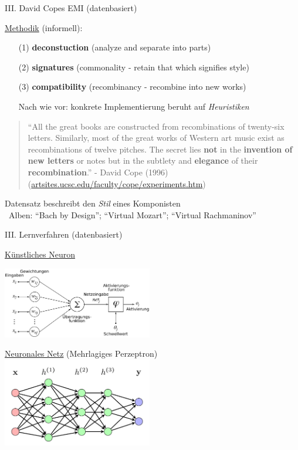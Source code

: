 \begin{frame}{III. \dimThreeTitle}{David Copes EMI (datenbasiert)}
	
	\underline{Methodik} (informell):
	\begin{itemize}	
		\item[(1)] \textbf{deconstuction} (analyze and separate into parts)
		\item[(2)] \textbf{signatures} (commonality - retain that which signifies style) 
		\item[(3)] \textbf{compatibility} (recombinancy - recombine into new works)
		\item[\warnSign] Nach wie vor: konkrete Implementierung beruht auf \emph{Heuristiken}
	\end{itemize}
	
	\medskip
	\begin{quote}
		\enquote{All the great books are constructed from recombinations of twenty-six letters. Similarly, most of the great works of Western art music exist as recombinations of twelve pitches. The secret lies \textbf{not} in the \textbf{invention of new letters} or notes but in the subtlety and \textbf{elegance} of their \textbf{recombination}.} - {\footnotesize David Cope (1996)}
		\\\hfill{\tiny(\url{artsites.ucsc.edu/faculty/cope/experiments.htm})}
	\end{quote}
	
	Datensatz beschreibt den \emph{Stil} eines Komponisten \citep{Cope96}\\
	\hfill\conclude~Alben: \enquote{Bach by Design}; \enquote{Virtual Mozart}; \enquote{Virtual Rachmaninov}
\end{frame}

\begin{frame}[t]{III. \dimThreeTitle}{Lernverfahren (datenbasiert)}
		\vspace{-1.5cm}
		\parbox{.49\textwidth}{
			\underline{Künstliches Neuron}
			\medskip

			\includegraphics[width=0.49\textwidth]{img/ArtificialNeuronModel_deutsch.png}
		}
		\parbox{.49\textwidth}{
			\vspace{3cm}
			\underline{Neuronales Netz} (Mehrlagiges Perzeptron)
			\includegraphics[width=0.49\textwidth]{img/MLP-Theorie.png}
		}
\end{frame}


